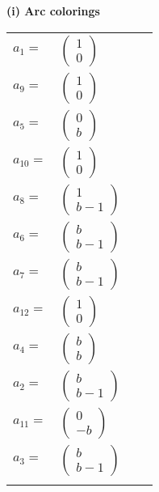 \documentclass[1p]{elsarticle_modified}
\theoremstyle{definition}
\begin{document}
\flushleft \textbf{(i) Arc colorings}\\
\begin{tabular}{m{7pt} m{180pt} m{7pt} m{180pt} }
\flushright $a_{1}=$&$\begin{pmatrix}1\\0\end{pmatrix}$ \\
\flushright $a_{9}=$&$\begin{pmatrix}1\\0\end{pmatrix}$ \\
\flushright $a_{5}=$&$\begin{pmatrix}0\\b\end{pmatrix}$ \\
\flushright $a_{10}=$&$\begin{pmatrix}1\\0\end{pmatrix}$ \\
\flushright $a_{8}=$&$\begin{pmatrix}1\\b-1\end{pmatrix}$ \\
\flushright $a_{6}=$&$\begin{pmatrix}b\\b-1\end{pmatrix}$ \\
\flushright $a_{7}=$&$\begin{pmatrix}b\\b-1\end{pmatrix}$ \\
\flushright $a_{12}=$&$\begin{pmatrix}1\\0\end{pmatrix}$ \\
\flushright $a_{4}=$&$\begin{pmatrix}b\\b\end{pmatrix}$ \\
\flushright $a_{2}=$&$\begin{pmatrix}b\\b-1\end{pmatrix}$ \\
\flushright $a_{11}=$&$\begin{pmatrix}0\\- b\end{pmatrix}$ \\
\flushright $a_{3}=$&$\begin{pmatrix}b\\b-1\end{pmatrix}$\\&\end{tabular}
\end{document}
